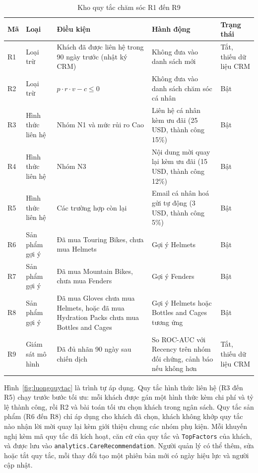 \begin{table}[!htbp]
\centering
\caption{Kho quy tắc chăm sóc R1 đến R9}
\label{tab:luat}
\footnotesize
\begin{tabular}{p{0.8cm}p{2.5cm}p{4.8cm}p{4.2cm}p{1.6cm}}
\toprule
Mã & Loại & Điều kiện & Hành động & Trạng thái \\
\midrule
R1 & Loại trừ & Khách đã được liên hệ trong 90 ngày trước (nhật ký CRM) & Không đưa vào danh sách mới & Tắt, thiếu dữ liệu CRM \\
R2 & Loại trừ & $p \cdot r \cdot v - c \leq 0$ & Không đưa vào danh sách chăm sóc cá nhân & Bật \\
R3 & Hình thức liên hệ & Nhóm N1 và mức rủi ro Cao & Liên hệ cá nhân kèm ưu đãi (25 USD, thành công 15\%) & Bật \\
R4 & Hình thức liên hệ & Nhóm N3 & Nội dung mời quay lại kèm ưu đãi (15 USD, thành công 12\%) & Bật \\
R5 & Hình thức liên hệ & Các trường hợp còn lại & Email cá nhân hoá gửi tự động (3 USD, thành công 5\%) & Bật \\
R6 & Sản phẩm gợi ý & Đã mua Touring Bikes, chưa mua Helmets & Gợi ý Helmets & Bật \\
R7 & Sản phẩm gợi ý & Đã mua Mountain Bikes, chưa mua Fenders & Gợi ý Fenders & Bật \\
R8 & Sản phẩm gợi ý & Đã mua Gloves chưa mua Helmets, hoặc đã mua Hydration Packs chưa mua Bottles and Cages & Gợi ý Helmets hoặc Bottles and Cages tương ứng & Bật \\
R9 & Giám sát mô hình & Đã đủ nhãn 90 ngày sau chiến dịch & So ROC-AUC với Recency trên nhóm đối chứng, cảnh báo nếu không hơn & Tắt, thiếu dữ liệu CRM \\
\bottomrule
\end{tabular}
\end{table}

Hình~\ref{fig:luongquytac} là trình tự áp dụng. Quy tắc hình thức liên hệ (R3 đến R5) chạy trước bước tối ưu: mỗi khách được gán một hình thức kèm chi phí và tỷ lệ thành công, rồi R2 và bài toán tối ưu chọn khách trong ngân sách. Quy tắc sản phẩm (R6 đến R8) chỉ áp dụng cho khách đã chọn, khách không khớp quy tắc nào nhận lời mời quay lại kèm giới thiệu chung các nhóm phụ kiện. Mỗi khuyến nghị kèm mã quy tắc đã kích hoạt, căn cứ của quy tắc và \texttt{TopFactors} của khách, và được lưu vào \texttt{analytics.\allowbreak CareRecommendation}. Người quản lý có thể thêm, sửa hoặc tắt quy tắc, mỗi thay đổi tạo một phiên bản mới có ngày hiệu lực và người cập nhật.

